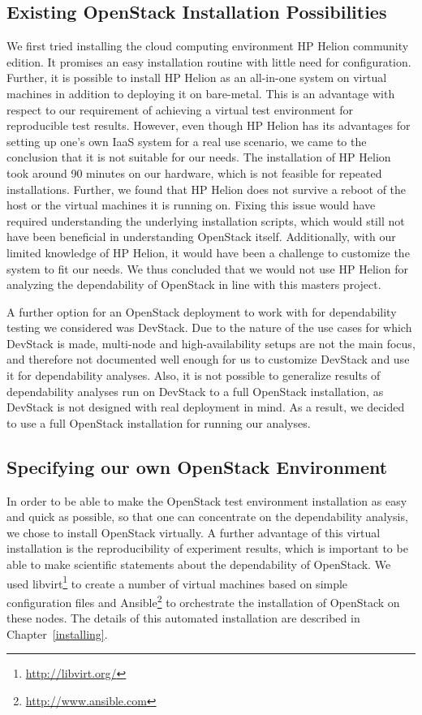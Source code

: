 \subsection{Existing OpenStack Installation Possibilities}
\label{installpossibilities}
We first tried installing the cloud computing environment HP Helion community edition. It promises an easy installation routine with little need for configuration. Further, it is possible to install HP Helion as an all-in-one system on virtual machines in addition to deploying it on bare-metal. This is an advantage with respect to our requirement of achieving a virtual test environment for reproducible test results. However, even though HP Helion has its advantages for setting up one's own IaaS system for a real use scenario, we came to the conclusion that it is not suitable for our needs. The installation of HP Helion took around 90 minutes on our hardware, which is not feasible for repeated installations. Further, we found that HP Helion does not survive a reboot of the host or the virtual machines it is running on. Fixing this issue would have required understanding the underlying installation scripts, which would still not have been beneficial in understanding OpenStack itself. Additionally, with our limited knowledge of HP Helion, it would have been a challenge to customize the system to fit our needs. We thus concluded that we would not use HP Helion for analyzing the dependability of OpenStack in line with this masters project.

A further option for an OpenStack deployment to work with for dependability testing we considered was DevStack. Due to the nature of the use cases for which DevStack is made, multi-node and high-availability setups are not the main focus, and therefore not documented well enough for us to customize DevStack and use it for dependability analyses. Also, it is not possible to generalize results of dependability analyses run on DevStack to a full OpenStack installation, as DevStack is not designed with real deployment in mind. As a result, we decided to use a full OpenStack installation for running our analyses.

\subsection{Specifying our own OpenStack Environment}
\label{environment}
In order to be able to make the OpenStack test environment installation as easy and quick as possible, so that one can concentrate on the dependability analysis, we chose to install OpenStack virtually. A further advantage of this virtual installation is the reproducibility of experiment results, which is important to be able to make scientific statements about the dependability of OpenStack. We used libvirt\footnote{\url{http://libvirt.org/}} to create a number of virtual machines based on simple configuration files and Ansible\footnote{\url{http://www.ansible.com}} to orchestrate the installation of OpenStack on these nodes. The details of this automated installation are described in Chapter~\ref{installing}.

